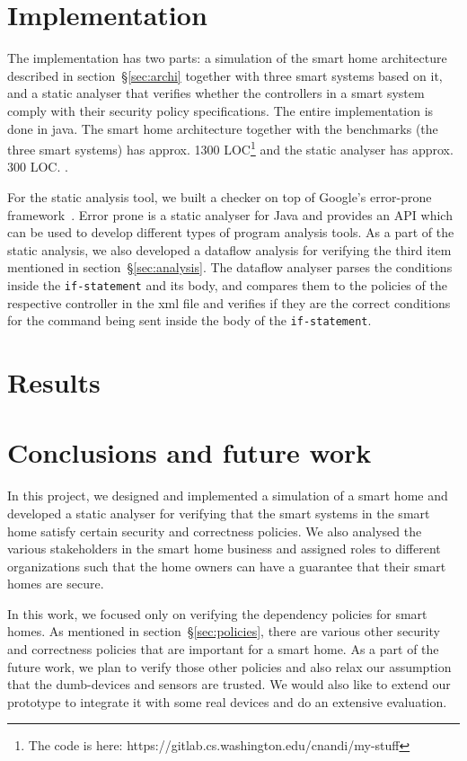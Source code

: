 \documentclass{article}
\begin{document}
\section{Implementation}
The implementation has two parts: a simulation of the smart home architecture described in section~\S\ref{sec:archi} together with three smart systems based on it, and a static analyser that verifies whether the controllers in a smart system comply with their security policy specifications. The entire implementation is done in java. The smart home architecture together with the benchmarks (the three smart systems) has approx. 1300 LOC\footnote{The code is here: https://gitlab.cs.washington.edu/cnandi/my-stuff} and the static analyser has approx. 300 LOC. . 
 
For the static analysis tool, we built a checker on top of Google's error-prone framework~\cite{errorprone}. Error prone is a static analyser for Java and provides an API which can be used to develop different types of program analysis tools. As a part of the static analysis, we also developed a dataflow analysis for verifying the third item mentioned in section~\S\ref{sec:analysis}. The dataflow analyser parses the conditions inside the \texttt{if-statement} and its body, and compares them to the policies of the respective controller in the xml file and verifies if they are the correct conditions for the command being sent inside the body of the \texttt{if-statement}. 

\section{Results}

\section{Conclusions and future work}
In this project, we designed and implemented a simulation of a smart home and developed a static analyser for verifying that the smart systems in the smart home satisfy certain security and correctness policies. We also analysed the various stakeholders in the smart home business and assigned roles to different organizations such that the home owners can have a guarantee that their smart homes are secure. 

In this work, we focused only on verifying the dependency policies for smart homes. As mentioned in section~\S\ref{sec:policies}, there are various other security and correctness policies that are important for a smart home. As a part of the future work, we plan to verify those other policies and also relax our assumption that the dumb-devices and sensors are trusted. We would also like to extend our prototype to integrate it with some real devices and do an extensive evaluation.


\end{document}
